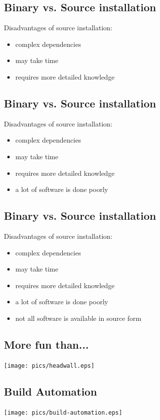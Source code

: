 \documentclass[xga]{xdvislides}
\begin{document}
\subsection{Binary vs. Source installation}
Disadvantages of source installation:
\begin{itemize}
	\item complex dependencies
	\item may take time
	\item requires more detailed knowledge
\end{itemize}

\subsection{Binary vs. Source installation}
Disadvantages of source installation:
\begin{itemize}
	\item complex dependencies
	\item may take time
	\item requires more detailed knowledge
	\item a lot of software is done poorly
\end{itemize}

\subsection{Binary vs. Source installation}
Disadvantages of source installation:
\begin{itemize}
	\item complex dependencies
	\item may take time
	\item requires more detailed knowledge
	\item a lot of software is done poorly
	\item not all software is available in source form
\end{itemize}

\subsection{More fun than...}
\vspace*{\fill}
\begin{center}
	\texttt{[image: pics/headwall.eps]}
\end{center}

\subsection{Build Automation}
\vspace*{\fill}
\begin{center}
	\texttt{[image: pics/build-automation.eps]}
\end{center}
\vspace*{\fill}
\end{document}
